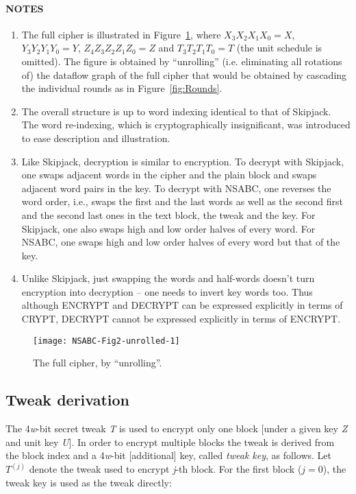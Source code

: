 \documentclass[a4paper,oneside,english]{amsart}
\numberwithin{equation}{section}
\numberwithin{figure}{section}
\begin{document}
\paragraph*{NOTES}
\begin{enumerate}
\item The full cipher is illustrated in Figure~\ref{fig:The-full-cipher-1},
where $X_{3}X_{2}X_{1}X_{0}=X$, $Y_{3}Y_{2}Y_{1}Y_{0}=Y$, $Z_{4}Z_{3}Z_{2}Z_{1}Z_{0}=Z$
and $T_{3}T_{2}T_{1}T_{0}=T$ (the unit schedule is omitted). The
figure is obtained by {}``unrolling'' (i.e. eliminating all rotations
of) the dataflow graph of the full cipher that would be obtained by
cascading the individual rounds as in Figure~\ref{fig:Rounds}.
\item The overall structure is up to word indexing identical to that of
Skipjack. The word re-indexing, which is cryptographically insignificant,
was introduced to ease description and illustration.
\item Like Skipjack, decryption is similar to encryption. To decrypt with
Skipjack, one swaps adjacent words in the cipher and the plain block
and swaps adjacent word pairs in the key. To decrypt with NSABC, one
reverses the word order, i.e., swaps the first and the last words
as well as the second first and the second last ones in the text block,
the tweak and the key. For Skipjack, one also swaps high and low order
halves of every word. For NSABC, one swaps high and low order halves
of every word but that of the key.
\item Unlike Skipjack, just swapping the words and half-words doesn't turn
encryption into decryption -- one needs to invert key words too. Thus
although ENCRYPT and DECRYPT can be expressed explicitly in terms
of CRYPT, DECRYPT cannot be expressed explicitly in terms of ENCRYPT.
\end{enumerate}
\begin{figure}
{\scriptsize \texttt{[image: NSABC-Fig2-unrolled-1]}}{\scriptsize \par}

\caption{\label{fig:The-full-cipher-1}The full cipher, by {}``unrolling''.}
\end{figure}



\subsection{Tweak derivation}

The 4\emph{w}-bit secret tweak \emph{T} is used to encrypt only one
block {[}under a given key \emph{Z} and unit key \emph{U}{]}. In order
to encrypt multiple blocks the tweak is derived from the block index
and a 4\emph{w}-bit {[}additional{]} key, called \emph{tweak key},
as follows. Let $T^{(j)}$ denote the tweak used to encrypt \emph{j}-th
block. For the first block ($j=0$), the tweak key is used as the
tweak directly: 
\end{document}
